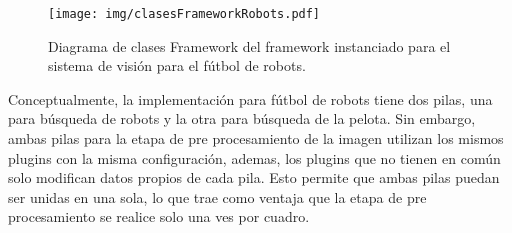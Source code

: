 \begin{figure}[h]

	\texttt{[image: img/clasesFrameworkRobots.pdf]}

	\caption{Diagrama de clases Framework del framework instanciado para el
	sistema de visión para el fútbol de robots.}

\end{figure}

Conceptualmente, la implementación para fútbol de robots tiene dos pilas, una
para búsqueda de robots y la otra para búsqueda de la pelota. Sin embargo, ambas
pilas para la etapa de pre procesamiento de la imagen utilizan los mismos
plugins con la misma configuración, ademas, los plugins que no tienen en común
solo modifican datos propios de cada pila. Esto permite que ambas pilas puedan
ser unidas en una sola, lo que trae como ventaja que la etapa de pre
procesamiento se realice solo una ves por cuadro.
